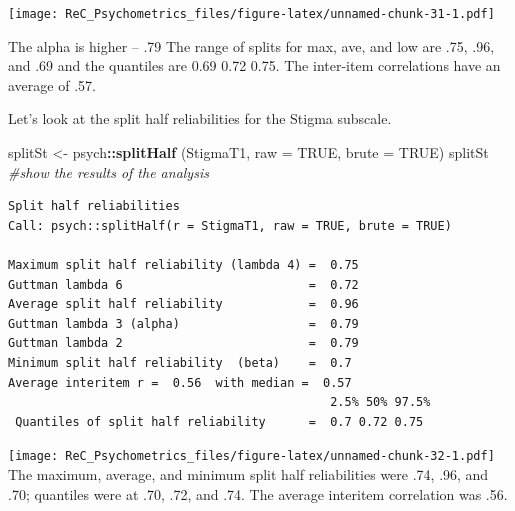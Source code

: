 \documentclass[
  english,
]{book}
\newenvironment{Shaded}{\begin{snugshade}}{\end{snugshade}}
\newcommand{\CommentTok}[1]{\textcolor[rgb]{0.56,0.35,0.01}{\textit{#1}}}
\newcommand{\DataTypeTok}[1]{\textcolor[rgb]{0.13,0.29,0.53}{#1}}
\newcommand{\DecValTok}[1]{\textcolor[rgb]{0.00,0.00,0.81}{#1}}
\newcommand{\KeywordTok}[1]{\textcolor[rgb]{0.13,0.29,0.53}{\textbf{#1}}}
\newcommand{\NormalTok}[1]{#1}
\newcommand{\OperatorTok}[1]{\textcolor[rgb]{0.81,0.36,0.00}{\textbf{#1}}}
\newcommand{\OtherTok}[1]{\textcolor[rgb]{0.56,0.35,0.01}{#1}}
\newcommand{\StringTok}[1]{\textcolor[rgb]{0.31,0.60,0.02}{#1}}
\begin{document}
\texttt{[image: ReC\_Psychometrics\_files/figure-latex/unnamed-chunk-31-1.pdf]}

The alpha is higher -- .79 The range of splits for max, ave, and low are .75, .96, and .69 and the quantiles are 0.69 0.72 0.75. The inter-item correlations have an average of .57.

Let's look at the split half reliabilities for the Stigma subscale.

\begin{Shaded}
\begin{Highlighting}[]
\NormalTok{splitSt <-}\StringTok{ }\NormalTok{psych}\OperatorTok{::}\KeywordTok{splitHalf}\NormalTok{ (StigmaT1, }\DataTypeTok{raw =} \OtherTok{TRUE}\NormalTok{, }\DataTypeTok{brute =} \OtherTok{TRUE}\NormalTok{)}
\NormalTok{splitSt }\CommentTok{#show the results of the analysis}
\end{Highlighting}
\end{Shaded}

\begin{verbatim}
Split half reliabilities  
Call: psych::splitHalf(r = StigmaT1, raw = TRUE, brute = TRUE)

Maximum split half reliability (lambda 4) =  0.75
Guttman lambda 6                          =  0.72
Average split half reliability            =  0.96
Guttman lambda 3 (alpha)                  =  0.79
Guttman lambda 2                          =  0.79
Minimum split half reliability  (beta)    =  0.7
Average interitem r =  0.56  with median =  0.57
                                             2.5% 50% 97.5%
 Quantiles of split half reliability      =  0.7 0.72 0.75
\end{verbatim}

\begin{Shaded}
\end{Shaded}

\texttt{[image: ReC\_Psychometrics\_files/figure-latex/unnamed-chunk-32-1.pdf]}
The maximum, average, and minimum split half reliabilities were .74, .96, and .70; quantiles were at .70, .72, and .74. The average interitem correlation was .56.
\end{document}
